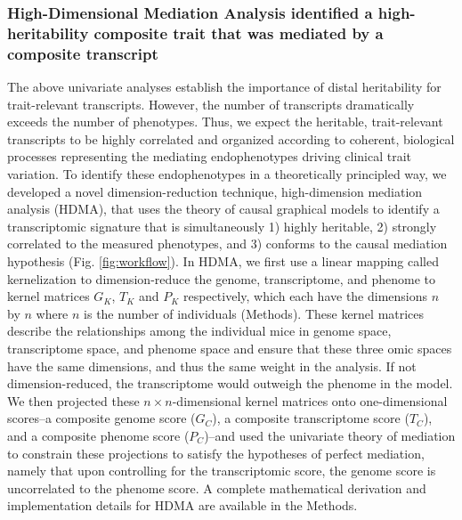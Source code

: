 \documentclass[
]{article}
\begin{document}
\subsubsection{High-Dimensional Mediation Analysis identified a
high-heritability composite trait that was mediated by a composite
transcript}\label{high-dimensional-mediation-analysis-identified-a-high-heritability-composite-trait-that-was-mediated-by-a-composite-transcript}

The above univariate analyses establish the importance of distal
heritability for trait-relevant transcripts. However, the number of
transcripts dramatically exceeds the number of phenotypes. Thus, we
expect the heritable, trait-relevant transcripts to be highly correlated
and organized according to coherent, biological processes representing
the mediating endophenotypes driving clinical trait variation. To
identify these endophenotypes in a theoretically principled way, we
developed a novel dimension-reduction technique, high-dimension
mediation analysis (HDMA), that uses the theory of causal graphical
models to identify a transcriptomic signature that is simultaneously 1)
highly heritable, 2) strongly correlated to the measured phenotypes, and
3) conforms to the causal mediation hypothesis (Fig.
\ref{fig:workflow}). In HDMA, we first use a linear mapping called
kernelization to dimension-reduce the genome, transcriptome, and phenome
to kernel matrices \(G_K\), \(T_K\) and \(P_K\) respectively, which each
have the dimensions \(n\) by \(n\) where \(n\) is the number of
individuals (Methods). These kernel matrices describe the relationships
among the individual mice in genome space, transcriptome space, and
phenome space and ensure that these three omic spaces have the same
dimensions, and thus the same weight in the analysis. If not
dimension-reduced, the transcriptome would outweigh the phenome in the
model. We then projected these \(n \times n\)-dimensional kernel
matrices onto one-dimensional scores--a composite genome score
(\(G_C\)), a composite transcriptome score (\(T_C\)), and a composite
phenome score (\(P_C\))--and used the univariate theory of mediation to
constrain these projections to satisfy the hypotheses of perfect
mediation, namely that upon controlling for the transcriptomic score,
the genome score is uncorrelated to the phenome score. A complete
mathematical derivation and implementation details for HDMA are
available in the Methods.
\end{document}
